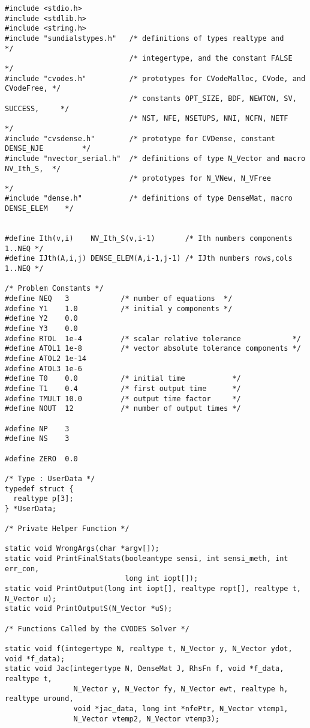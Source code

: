 \begin{verbatim}
#include <stdio.h>
#include <stdlib.h>
#include <string.h>
#include "sundialstypes.h"   /* definitions of types realtype and                 */
                             /* integertype, and the constant FALSE               */
#include "cvodes.h"          /* prototypes for CVodeMalloc, CVode, and CVodeFree, */
                             /* constants OPT_SIZE, BDF, NEWTON, SV, SUCCESS,     */
                             /* NST, NFE, NSETUPS, NNI, NCFN, NETF                */
#include "cvsdense.h"        /* prototype for CVDense, constant DENSE_NJE         */
#include "nvector_serial.h"  /* definitions of type N_Vector and macro NV_Ith_S,  */
                             /* prototypes for N_VNew, N_VFree                    */
#include "dense.h"           /* definitions of type DenseMat, macro DENSE_ELEM    */


#define Ith(v,i)    NV_Ith_S(v,i-1)       /* Ith numbers components 1..NEQ */
#define IJth(A,i,j) DENSE_ELEM(A,i-1,j-1) /* IJth numbers rows,cols 1..NEQ */

/* Problem Constants */
#define NEQ   3            /* number of equations  */
#define Y1    1.0          /* initial y components */
#define Y2    0.0
#define Y3    0.0
#define RTOL  1e-4         /* scalar relative tolerance            */
#define ATOL1 1e-8         /* vector absolute tolerance components */
#define ATOL2 1e-14
#define ATOL3 1e-6
#define T0    0.0          /* initial time           */
#define T1    0.4          /* first output time      */
#define TMULT 10.0         /* output time factor     */
#define NOUT  12           /* number of output times */

#define NP    3
#define NS    3

#define ZERO  0.0

/* Type : UserData */
typedef struct {
  realtype p[3];
} *UserData;

/* Private Helper Function */

static void WrongArgs(char *argv[]);
static void PrintFinalStats(booleantype sensi, int sensi_meth, int err_con, 
                            long int iopt[]);
static void PrintOutput(long int iopt[], realtype ropt[], realtype t, N_Vector u);
static void PrintOutputS(N_Vector *uS);

/* Functions Called by the CVODES Solver */

static void f(integertype N, realtype t, N_Vector y, N_Vector ydot, void *f_data);
static void Jac(integertype N, DenseMat J, RhsFn f, void *f_data, realtype t,
                N_Vector y, N_Vector fy, N_Vector ewt, realtype h, realtype uround,
                void *jac_data, long int *nfePtr, N_Vector vtemp1,
                N_Vector vtemp2, N_Vector vtemp3);



\end{verbatim}

